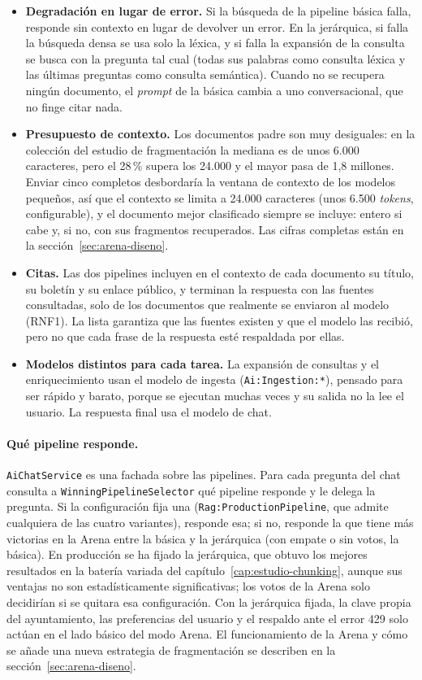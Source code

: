 \begin{itemize}
  \item \textbf{Degradación en lugar de error.} Si la búsqueda de la pipeline básica falla, responde sin contexto en lugar de devolver un error. En la jerárquica, si falla la búsqueda densa se usa solo la léxica, y si falla la expansión de la consulta se busca con la pregunta tal cual (todas sus palabras como consulta léxica y las últimas preguntas como consulta semántica). Cuando no se recupera ningún documento, el \emph{prompt} de la básica cambia a uno conversacional, que no finge citar nada.
  \item \textbf{Presupuesto de contexto.} Los documentos padre son muy desiguales: en la colección del estudio de fragmentación la mediana es de unos 6.000 caracteres, pero el 28\,\% supera los 24.000 y el mayor pasa de 1,8 millones. Enviar cinco completos desbordaría la ventana de contexto de los modelos pequeños, así que el contexto se limita a 24.000 caracteres (unos 6.500 \emph{tokens}, configurable), y el documento mejor clasificado siempre se incluye: entero si cabe y, si no, con sus fragmentos recuperados. Las cifras completas están en la sección~\ref{sec:arena-diseno}.
  \item \textbf{Citas.} Las dos pipelines incluyen en el contexto de cada documento su título, su boletín y su enlace público, y terminan la respuesta con las fuentes consultadas, solo de los documentos que realmente se enviaron al modelo (RNF1). La lista garantiza que las fuentes existen y que el modelo las recibió, pero no que cada frase de la respuesta esté respaldada por ellas.
  \item \textbf{Modelos distintos para cada tarea.} La expansión de consultas y el enriquecimiento usan el modelo de ingesta (\texttt{Ai:Ingestion:*}), pensado para ser rápido y barato, porque se ejecutan muchas veces y su salida no la lee el usuario. La respuesta final usa el modelo de chat.
\end{itemize}

\paragraph{Qué pipeline responde.} \texttt{AiChatService} es una fachada sobre las pipelines. Para cada pregunta del chat consulta a \texttt{WinningPipelineSelector} qué pipeline responde y le delega la pregunta. Si la configuración fija una (\texttt{Rag:ProductionPipeline}, que admite cualquiera de las cuatro variantes), responde esa; si no, responde la que tiene más victorias en la Arena entre la básica y la jerárquica (con empate o sin votos, la básica). En producción se ha fijado la jerárquica, que obtuvo los mejores resultados en la batería variada del capítulo~\ref{cap:estudio-chunking}, aunque sus ventajas no son estadísticamente significativas; los votos de la Arena solo decidirían si se quitara esa configuración. Con la jerárquica fijada, la clave propia del ayuntamiento, las preferencias del usuario y el respaldo ante el error 429 solo actúan en el lado básico del modo Arena. El funcionamiento de la Arena y cómo se añade una nueva estrategia de fragmentación se describen en la sección~\ref{sec:arena-diseno}.

